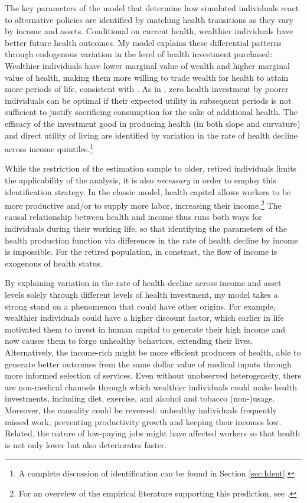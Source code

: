 \documentclass[12pt,pdftex,letterpaper]{article}
\begin{document}
The key parameters of the model that determine how simulated individuals react to alternative policies are identified by matching health transitions as they vary by income and assets. Conditional on current health, wealthier individuals have better future health outcomes.  My model explains these differential patterns through endogenous variation in the level of health investment purchased: Wealthier individuals have lower marginal value of wealth and higher marginal value of health, making them more willing to trade wealth for health to attain more periods of life, consistent with \cite{hall07}.  As in \cite{arcidiacono07}, zero health investment by poorer individuals can be optimal if their expected utility in subsequent periods is not sufficient to justify sacrificing consumption for the sake of additional health.  The efficacy of the investment good in producing health (in both slope and curvature) and direct utility of living are identified by variation in the rate of health decline across income quintiles.\footnote{A complete discussion of identification can be found in Section \ref{sec:Ident}.}

While the restriction of the estimation sample to older, retired individuals limits the applicability of the analysis, it is also \textit{necessary} in order to employ this identification strategy.  In the classic \cite{grossman72} model, health capital allows workers to be more productive and/or to supply more labor, increasing their income.\footnote{For an overview of the empirical literature supporting this prediction, see \cite{currie99}.}  The causal relationship between health and income thus runs both ways for individuals during their working life, so that identifying the parameters of the health production function via differences in the rate of health decline by income is impossible.  For the retired population, in constrast, the flow of income is exogenous of health status.

By explaining variation in the rate of health decline across income and asset levels solely through different levels of health investment, my model takes a strong stand on a phenomenon that could have other origins.  For example, wealthier individuals could have a higher discount factor, which earlier in life motivated them to invest in human capital to generate their high income and now causes them to forgo unhealthy behaviors, extending their lives.  Alternatively, the income-rich might be more efficient producers of health, able to generate better outcomes from the same dollar value of medical inputs through more informed selection of services. Even without unobserved heterogeneity, there are non-medical channels through which wealthier individuals could make health investments, including diet, exercise, and alcohol and tobacco (non-)usage.  Moreover, the causality could be reversed: unhealthy individuals frequently missed work, preventing productivity growth and keeping their incomes low.  Related, the nature of low-paying jobs might have affected workers so that health is not only lower but also deteriorates faster.
\end{document}
